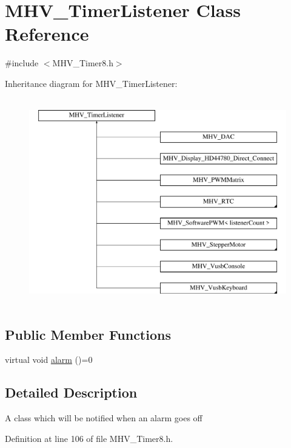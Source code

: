 \hypertarget{class_m_h_v___timer_listener}{
\section{\-M\-H\-V\-\_\-\-Timer\-Listener \-Class \-Reference}
\label{class_m_h_v___timer_listener}
}


{\ttfamily \#include $<$\-M\-H\-V\-\_\-\-Timer8.\-h$>$}

\-Inheritance diagram for \-M\-H\-V\-\_\-\-Timer\-Listener\-:\begin{figure}[H]
\begin{center}
\leavevmode
\includegraphics[height=9.000000cm]{class_m_h_v___timer_listener}
\end{center}
\end{figure}
\subsection*{\-Public \-Member \-Functions}
\begin{DoxyCompactItemize}
\item 
virtual void \hyperlink{class_m_h_v___timer_listener_a27e243f8df77035eca626beab5b3e60a}{alarm} ()=0
\end{DoxyCompactItemize}


\subsection{\-Detailed \-Description}
\-A class which will be notified when an alarm goes off 

\-Definition at line 106 of file \-M\-H\-V\-\_\-\-Timer8.\-h.



